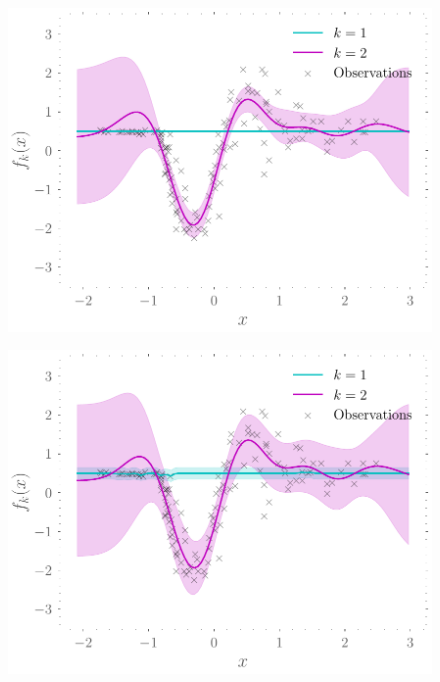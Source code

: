 \documentclass{mimosis-class/mimosis}
\numberwithin{equation}{chapter}
\newcommand{\modeInd}{\ensuremath{k}}
\newcommand{\ModeInd}{\ensuremath{\MakeUppercase{\modeInd}}}
\begin{document}
{%
\begin{figure}[hbt!]
\centering
\begin{minipage}[r]{0.49\textwidth}
\centering
\includegraphics[width=\textwidth]{./images/model/mcycle/K=2_L2/experts_f.pdf}
\label{fig-expert-gps-mcycle-two-experts-tight}
\end{minipage}
\begin{minipage}[r]{0.49\textwidth}
\centering
\includegraphics[width=\textwidth]{./images/model/mcycle/K=2_L3/experts_f.pdf}

\end{minipage}
\end{figure}}
\end{document}
